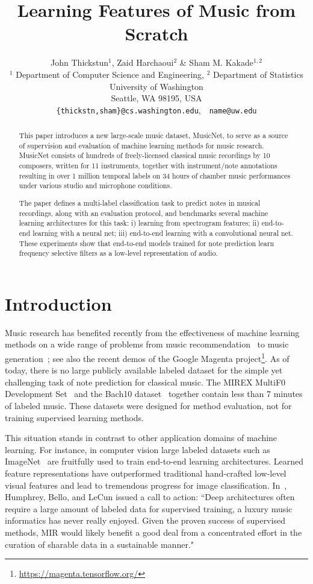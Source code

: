\documentclass{article} \usepackage{iclr2017_conference,times}
\title{Learning Features of Music from Scratch}
\author{John Thickstun$^1$, Zaid Harchaoui$^2$ \& Sham M. Kakade$^{1,2}$ \\
$^1$ Department of Computer Science and Engineering, $^2$ Department of Statistics  \\
University of Washington\\
Seattle, WA 98195, USA \\
\texttt{\{thickstn,sham\}@cs.washington.edu},~~\texttt{name@uw.edu} \\
}
\begin{document}
\maketitle

\begin{abstract}
This paper introduces a new large-scale music dataset, MusicNet, to serve as a source 
of supervision and evaluation of machine learning methods for music research. 
MusicNet consists of hundreds of freely-licensed classical music recordings 
by 10 composers, written for 11 instruments, together with instrument/note 
annotations resulting in over 1 million temporal labels on 34 hours of chamber music
performances under various studio and microphone conditions. 

The paper defines a multi-label classification task to predict notes in musical recordings, 
along with an evaluation protocol, and benchmarks several machine learning architectures for this task: 
i) learning from spectrogram features; 
ii) end-to-end learning with a neural net; 
iii) end-to-end learning with a convolutional neural net. 
These experiments show that end-to-end models trained for note prediction learn frequency
selective filters as a low-level representation of audio. 
\end{abstract}

\section{Introduction}

Music research has benefited recently from the effectiveness of machine learning methods on a wide range of problems from music recommendation~\citep{spotify,mcfee} to music generation~\citep{deepbach}; see also the recent demos of the Google Magenta project\footnote{\url{https://magenta.tensorflow.org/}}. 
As of today, there is no large publicly available labeled dataset for the simple yet challenging task of note prediction for classical music. The MIREX MultiF0 Development Set~\citep{mirex_dataset} and the Bach10 dataset~\citep{bach10_dataset} together contain less than 7 minutes of labeled music. These datasets were designed for method evaluation, not for training supervised learning methods. 

This situation stands in contrast to other application domains of machine learning. For instance, in computer vision large labeled datasets such as ImageNet~\citep{imagenet} are fruitfully used to train end-to-end learning architectures. Learned feature representations have outperformed traditional hand-crafted low-level visual features and lead to tremendous progress for image classification. In~\citep{lecun}, Humphrey, Bello, and LeCun issued a call to action: ``Deep architectures often require a large amount of labeled data for supervised training, a luxury music informatics has never really enjoyed. Given the proven success of supervised methods, MIR would likely benefit a good deal from a concentrated effort in the curation of sharable data in a sustainable manner."
\end{document}
